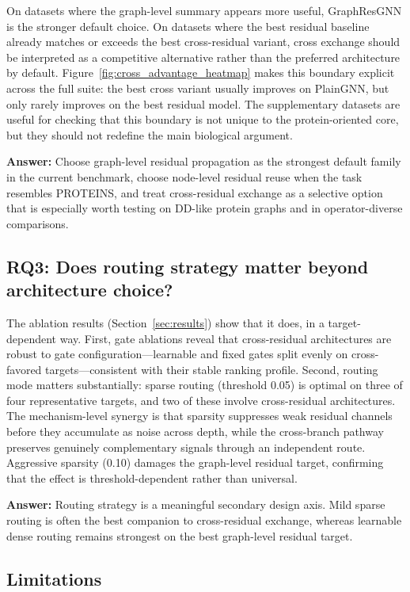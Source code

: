 On datasets where the graph-level summary appears more useful, GraphResGNN is the stronger default choice. On datasets where the best residual baseline already matches or exceeds the best cross-residual variant, cross exchange should be interpreted as a competitive alternative rather than the preferred architecture by default. Figure~\ref{fig:cross_advantage_heatmap} makes this boundary explicit across the full suite: the best cross variant usually improves on PlainGNN, but only rarely improves on the best residual model. The supplementary datasets are useful for checking that this boundary is not unique to the protein-oriented core, but they should not redefine the main biological argument.

\textbf{Answer:} Choose graph-level residual propagation as the strongest default family in the current benchmark, choose node-level residual reuse when the task resembles PROTEINS, and treat cross-residual exchange as a selective option that is especially worth testing on DD-like protein graphs and in operator-diverse comparisons.

\subsection{RQ3: Does routing strategy matter beyond architecture choice?}

The ablation results (Section~\ref{sec:results}) show that it does, in a target-dependent way. First, gate ablations reveal that cross-residual architectures are robust to gate configuration---learnable and fixed gates split evenly on cross-favored targets---consistent with their stable ranking profile. Second, routing mode matters substantially: sparse routing (threshold 0.05) is optimal on three of four representative targets, and two of these involve cross-residual architectures. The mechanism-level synergy is that sparsity suppresses weak residual channels before they accumulate as noise across depth, while the cross-branch pathway preserves genuinely complementary signals through an independent route. Aggressive sparsity (0.10) damages the graph-level residual target, confirming that the effect is threshold-dependent rather than universal.

\textbf{Answer:} Routing strategy is a meaningful secondary design axis. Mild sparse routing is often the best companion to cross-residual exchange, whereas learnable dense routing remains strongest on the best graph-level residual target.

\subsection{Limitations}

